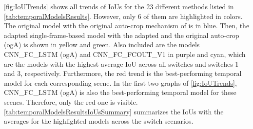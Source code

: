 \autoref{fig:IoUTrends} shows all trends of \ac{IoU}s for the 23 different methods listed in \autoref{tab:temporalModelsResults}.
However, only 6 of them are highlighted in colors.
The original model with the original auto-crop mechanism of \cite{tepNet2024} is in blue.
Then, the adapted single-frame-based model with the adapted and the original auto-crop (ogA) is shown in yellow and green.
Also included are the models CNN\_FC\_LSTM (ogA) and CNN\_FC\_FCOUT\_V1 in purple and cyan, which are the models with the highest average \ac{IoU} across all switches and switches 1 and 3, respectively.
Furthermore, the red trend is the best-performing temporal model for each corresponding scene.
In the first two graphs of \autoref{fig:IoUTrends}, CNN\_FC\_LSTM (ogA) is also the best-performing temporal model for these scenes.
Therefore, only the red one is visible.
\autoref{tab:temporalModelsResultsIoUsSummary} summarizes the \ac{IoU}s with the averages for the highlighted models across the switch scenarios.

